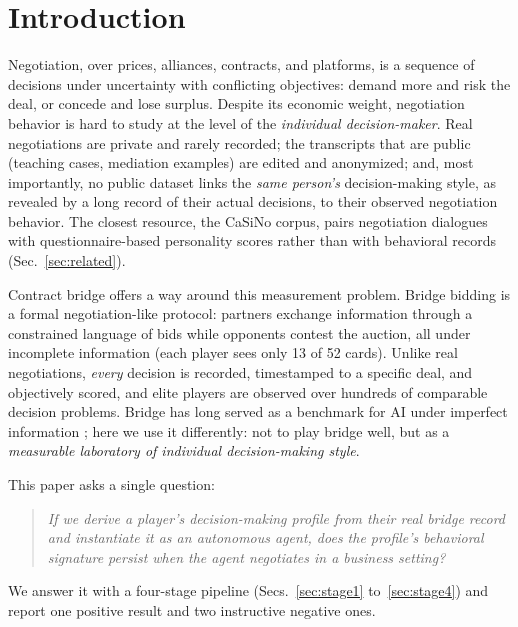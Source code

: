 \documentclass[runningheads]{llncs}
\begin{document}
\section{Introduction}\label{sec:intro}

Negotiation, over prices, alliances, contracts, and platforms, is a
sequence of decisions under uncertainty with conflicting objectives:
demand more and risk the deal, or concede and lose surplus. Despite its
economic weight, negotiation behavior is hard to study at the level of
the \emph{individual decision-maker}. Real negotiations are private and
rarely recorded; the transcripts that are public (teaching cases,
mediation examples) are edited and anonymized; and, most importantly, no
public dataset links the \emph{same person's} decision-making style, as
revealed by a long record of their actual decisions, to their observed
negotiation behavior. The closest resource, the CaSiNo corpus, pairs
negotiation dialogues with questionnaire-based personality scores rather
than with behavioral records (Sec.~\ref{sec:related}).

Contract bridge offers a way around this measurement problem. Bridge
bidding is a formal negotiation-like protocol: partners exchange
information through a constrained language of bids while opponents
contest the auction, all under incomplete information (each player sees
only 13 of 52 cards). Unlike real negotiations, \emph{every} decision is
recorded, timestamped to a specific deal, and objectively scored, and
elite players are observed over hundreds of comparable decision
problems. Bridge has long served as a benchmark for AI under imperfect
information \cite{ginsberg2001gib,rong2019bridge}; here we use it
differently: not to play bridge well, but as a \emph{measurable
laboratory of individual decision-making style}.

This paper asks a single question:

\begin{quote}
\emph{If we derive a player's decision-making profile from their real
bridge record and instantiate it as an autonomous agent, does the
profile's behavioral signature persist when the agent negotiates in a
business setting?}
\end{quote}

We answer it with a four-stage pipeline (Secs.~\ref{sec:stage1}
to~\ref{sec:stage4}) and report one positive result and two
instructive negative ones.
\end{document}
